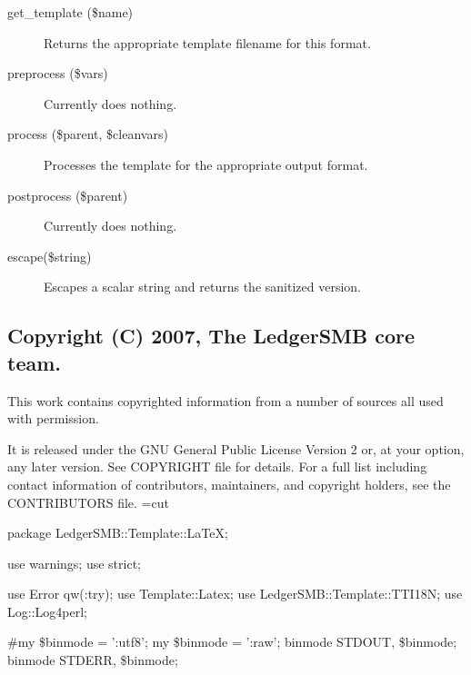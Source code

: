\begin{description}
\begin{description}
\begin{description}
\begin{description}
\begin{description}
\begin{description}
\begin{description}
\begin{description}
\begin{description}
\begin{description}
\begin{description}
\item[{get\_template (\$name)}] \mbox{}

Returns the appropriate template filename for this format.


\item[{preprocess (\$vars)}] \mbox{}

Currently does nothing.


\item[{process (\$parent, \$cleanvars)}] \mbox{}

Processes the template for the appropriate output format.


\item[{postprocess (\$parent)}] \mbox{}

Currently does nothing.


\item[{escape(\$string)}] \mbox{}

Escapes a scalar string and returns the sanitized version.

\end{description}
\subsection*{Copyright (C) 2007, The LedgerSMB core team.\label{LedgerSMB::Template::LaTeX_Copyright_C_2007_The_LedgerSMB_core_team_}}


This work contains copyrighted information from a number of sources all used
with permission.



It is released under the GNU General Public License Version 2 or, at your 
option, any later version.  See COPYRIGHT file for details.  For a full list 
including contact information of contributors, maintainers, and copyright 
holders, see the CONTRIBUTORS file.
=cut



package LedgerSMB::Template::LaTeX;



use warnings;
use strict;



use Error qw(:try);
use Template::Latex;
use LedgerSMB::Template::TTI18N;
use Log::Log4perl;



\#my \$binmode = ':utf8';
my \$binmode = ':raw';
binmode STDOUT, \$binmode;
binmode STDERR, \$binmode;




\end{description}
\end{description}
\end{description}
\end{description}
\end{description}
\end{description}
\end{description}
\end{description}
\end{description}
\end{description}
